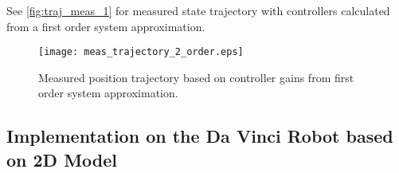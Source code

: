 See \autoref{fig:traj_meas_1} for measured state trajectory with controllers calculated from a first order system approximation.
\begin{figure}[H]
	\center
		\texttt{[image: meas\_trajectory\_2\_order.eps]}
	\caption{Measured position trajectory based on controller gains from first order system approximation.}
	\label{fig:traj_meas_1}
\end{figure}

\subsection{Implementation on the Da Vinci Robot based on 2D Model}\label{subsec-implement-2dmodel}
